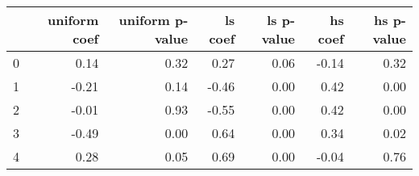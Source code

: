 \begin{tabular}{lrrrrrr}
\toprule
 & uniform coef & uniform p-value & ls coef & ls p-value & hs coef & hs p-value \\
\midrule
0 & 0.14 & 0.32 & 0.27 & 0.06 & -0.14 & 0.32 \\
1 & -0.21 & 0.14 & -0.46 & 0.00 & 0.42 & 0.00 \\
2 & -0.01 & 0.93 & -0.55 & 0.00 & 0.42 & 0.00 \\
3 & -0.49 & 0.00 & 0.64 & 0.00 & 0.34 & 0.02 \\
4 & 0.28 & 0.05 & 0.69 & 0.00 & -0.04 & 0.76 \\
\bottomrule
\end{tabular}
